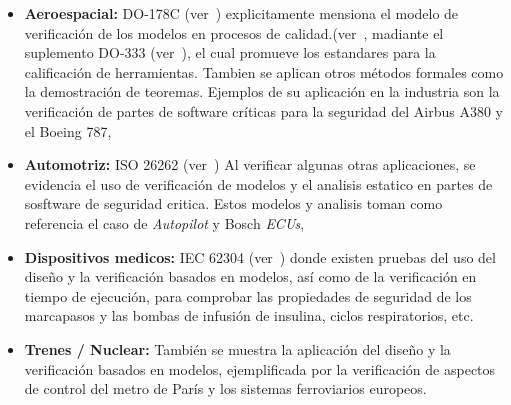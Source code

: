 \begin{itemize}
\item {\bf Aeroespacial:}  DO-178C (ver~\cite{RTCA-DO-178C}) explicitamente mensiona el modelo de verificación de los modelos en procesos de calidad.(ver~\cite{moy:ieeesoft-30_3}, madiante el suplemento DO-333 (ver~\cite{RTCA-DO-333}), el cual promueve los estandares para la calificación de herramientas. Tambien se aplican otros métodos formales como la demostración de teoremas. Ejemplos de su aplicación en la industria son la verificación de partes de software críticas para la seguridad del Airbus A380 y el Boeing 787,

\item {\bf Automotriz:} ISO 26262 (ver~\cite{ISO-26262}) Al verificar algunas otras aplicaciones, se evidencia el uso de verificación de modelos y el analisis estatico en partes de sosftware de seguridad critica. Estos modelos y analisis toman como referencia el caso de \textit{Autopilot} y Bosch \textit{ECUs},


\item {\bf Dispositivos medicos:} IEC 62304 (ver~\cite{IEC-62304-2006}) donde existen pruebas del uso del diseño y la verificación basados en modelos, así como de la verificación en tiempo de ejecución, para comprobar las propiedades de seguridad de los marcapasos y las bombas de infusión de insulina, ciclos respiratorios, etc.


\item {\bf Trenes / Nuclear:} También se muestra la aplicación del diseño y la verificación basados en modelos, ejemplificada por la verificación de aspectos de control del metro de París y los sistemas ferroviarios europeos.

\end{itemize}

